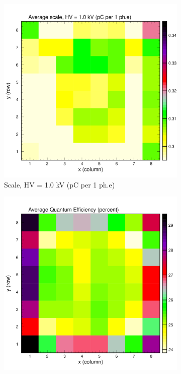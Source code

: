 \begin{figure}[hbt]
	\centering
	\begin{subfigure}[c]{0.24\linewidth}
		\centering
		\includegraphics[width=\linewidth, trim={0mm 0mm 0mm 19mm},clip]{figures/pglobal_sc2d.pdf}
		\caption{Scale, HV = 1.0 kV (pC per 1 ph.e)}
		\vspace{0mm}
	\end{subfigure}%
	\begin{subfigure}[c]{0.24\linewidth}
		\centering
		\includegraphics[width=\linewidth, trim={0mm 0mm 0mm 19mm},clip]{figures/pglobal_qe.pdf}

\end{subfigure}
\end{figure}
